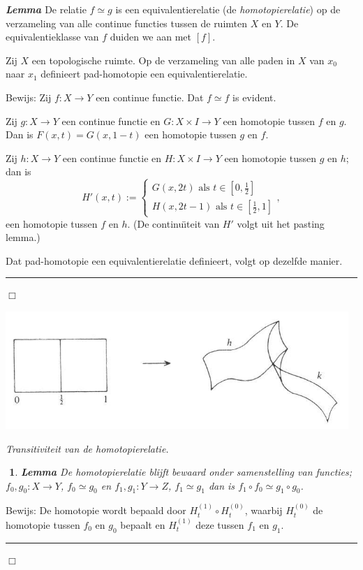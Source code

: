 \documentclass[12pt]{book}
\newcommand{\bew}{{\sc Bewijs: }}
\newcommand{\B}{\rule{1mm}{0mm} \hfill $\Box$ }
\newenvironment{lem}{\begin{lemh}{\em {\bf Lemma }}}{\end{lemh}}
\newtheorem{eigh}[stelh]{$\!\!$}
\newenvironment{eig}{\begin{eigh}{\em {\bf Lemma }}}{\end{eigh}}
\begin{document}
\begin{lem} De relatie $f\simeq g$ is een equivalentierelatie (de {\em homotopierelatie}) op de
verzameling van alle continue functies tussen de ruimten $X$ en $Y$. De equivalentieklasse van $f$
duiden we aan met $[f]$.

Zij $X$ een topologische ruimte. Op de verzameling van alle paden in $X$ van $x_0$ naar $x_1$ definieert pad-homotopie een equivalentierelatie.
\end{lem}
\bew Zij $f: X\to Y$ een continue functie. 
Dat $f\simeq f$ is evident. 

Zij $g:X\to Y$ een continue functie en $G:X\times I \to Y$ een homotopie tussen $f$ en $g$. Dan is
$F(x,t)=G(x, 1-t)$ een homotopie tussen $g$ en $f$.

Zij $h: X\to Y$ een continue functie en $H:X\times I \to Y$ een homotopie tussen $g$ en $h$; dan is
$$H'(x,t):=\left\{\begin{array}{l} G(x,2t) \mbox{ als } t\in [0, \frac{1}{2}] \\
H(x, 2t-1) \mbox{ als } t\in [\frac{1}{2}, 1]\end{array}\right.,$$
een homotopie tussen $f$ en $h$. (De continu\"{\i}teit van $H'$ volgt uit het pasting lemma.) 

Dat pad-homotopie een equivalentierelatie definieert, volgt op dezelfde manier.  
\B  

\begin{center}
\includegraphics[width=13cm]{images/transitief.jpg}

\vspace{3mm}
{\em Transitiviteit van de homotopierelatie.}
\end{center}

\begin{eig} De homotopierelatie blijft bewaard onder samenstelling van functies; $f_0, g_0:X\to Y$,
$f_0\simeq g_0$ en $f_1, g_1:Y\to Z$, $f_1\simeq g_1$ dan is $f_1\circ f_0\simeq g_1 \circ g_0$.
\end{eig}

\bew De homotopie wordt bepaald door $H_{t}^{(1)}\circ H_{t}^{(0)}$, waarbij $H_{t}^{(0)}$ de homotopie tussen $f_0$ en $g_0$ bepaalt en $H_{t}^{(1)}$ deze tussen $f_1$ en $g_1$. \B
\end{document}

